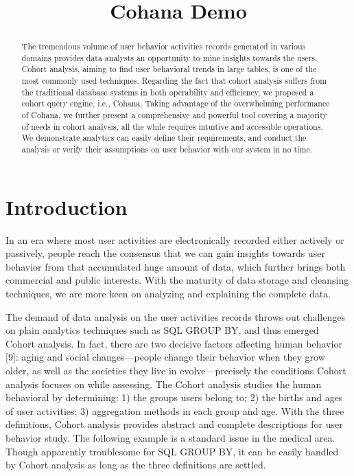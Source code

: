 \documentclass[10pt,conference,letterpaper]{IEEEtran}
\title{Cohana Demo}
\begin{document}
\maketitle
%
\begin{abstract} 
The tremendous volume of user behavior activities records generated in various domains provides data analysts an opportunity to mine insights towards the users. Cohort analysis, aiming to find user behavioral trends in large tables, is one of the most commonly used techniques. Regarding the fact that cohort analysis suffers from the traditional database systems in both operability and efficiency, we proposed a cohort query engine, i.e., Cohana. Taking advantage of the overwhelming performance of Cohana, we further present a comprehensive and powerful tool covering a majority of needs in cohort analysis, all the while requires intuitive and accessible operations. We demonstrate analytics can easily define their requirements, and conduct the analysis or verify their assumptions on user behavior with our system in no time.
\end{abstract}

%
\section{Introduction}
%
In an era where most user activities are electronically recorded either actively or passively, people reach the consensus that we can gain insights towards user behavior from that accumulated huge amount of data, which further brings both commercial and public interests. With the maturity of data storage and cleansing techniques, we are more keen on analyzing and explaining the complete data.

The demand of data analysis on the user activities records throws out challenges on plain analytics techniques such as SQL GROUP BY, and thus emerged Cohort analysis. In fact, there are two decisive factors affecting human behavior [9]: aging and social changes---people change their behavior when they grow older, as well as the societies they live in evolve---precisely the conditions Cohort analysis focuses on while assessing. The Cohort analysis studies the human behavioral by determining: 1) the groups users belong to; 2) the births and ages of user activities; 3) aggregation methods in each group and age. With the three definitions, Cohort analysis provides abstract and complete descriptions for user behavior study. The following example is a standard issue in the medical area. Though apparently troublesome for SQL GROUP BY, it can be easily handled by Cohort analysis as long as the three definitions are settled.
\end{document}
